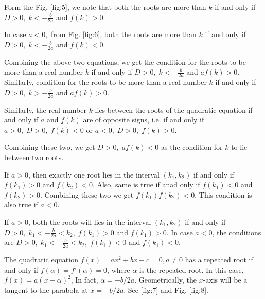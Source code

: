 Form the Fig. [fig:5], we note that both the roots are more than $k$ if and only if $D>0,\;k<-\frac{b}{2a}$ and $f(k)>0$.

In case $a< 0,$ from Fig. [fig:6], both the roots are more than $k$ if and only if $D>0,\;k<-\frac{b}{2a}$ and $f(k)<0$.


\startplacefigure[title={When $D > 0$ and $a < 0$}, reference=fig:6]
\stopplacefigure

Combining the above two equations, we get the condition for the roots to be more than a real number $k$ if and only if
$D>0,\;k<-\frac{b}{2a}$ and $af(k)>0$. Similarly, condition for the roots to be more than a real number $k$ if and only if
$D>0,\;k>-\frac{b}{2a}$ and $af(k)>0$.



Similarly, the real number $k$ lies between the roots of the quadratic equation if and only if $a$ and $f(k)$ are of opposite
signs, i.e. if and only if $a>0,\;D>0,\;f(k) < 0$ or $a< 0,\;D>0,\;f(k)>0$.

Combining these two, we get $D>0,\;af(k) < 0$ as the condition for $k$ to lie between two roots.


If $a>0$, then exactly one root lies in the interval $(k_1, k_2)$ if and only if $f(k_1)>0$ and $f(k_2)<0$. Also, same is true if
anad only if $f(k_1)<0$ and $f(k_2)>0$. Combining these two we get $f(k_1)f(k_2) < 0$. This condition is also true if $a<0$.


If $a >0$, both the roots will lies in the interval $(k_1, k_2)$ if and only if $D>0,\;k_1<-\frac{b}{2a}<k_2,\;f(k_1)>0$ and
$f(k_1)>0$. In case $a<0$, the conditions are $D>0,\;k_1<-\frac{b}{2a}<k_2,\;f(k_1)<0$ and $f(k_1)<0$.


The quadratic equation $f(x) = ax^2 + bx + c = 0, a\neq 0$ has a repeated root if and only if $f(\alpha) = f'(\alpha) = 0$, where
$\alpha$ is the repeated root. In this case, $f(x) = a(x - \alpha)^2$, In fact, $\alpha = -b/2a$. Geometrically, the $x$-axis will
be a tangent to the parabola at $x = -b/2a$. See [fig:7] and Fig. [fig:8].

